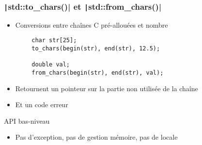 \documentclass[C++.tex]{subfiles}
\begin{document}
\begin{frame}[fragile]
	\frametitle{\texttt|std::to_chars()| et \texttt|std::from_chars()|}
	\begin{itemize}
		\item Conversions entre chaînes C pré-allouées et nombre
	\end{itemize}

	\begin{verbatim}
		char str[25];
		to_chars(begin(str), end(str), 12.5);

		double val;
		from_chars(begin(str), end(str), val);
	\end{verbatim}

	\begin{itemize}
		\item Retournent un pointeur sur la partie non utilisée de la chaîne


		\item Et un code erreur
	\end{itemize}

	\begin{alertblock}{API bas-niveau}
		\begin{itemize}
			\item Pas d'exception, pas de gestion mémoire, pas de locale
		\end{itemize}
	\end{alertblock}


\end{frame}
\end{document}
